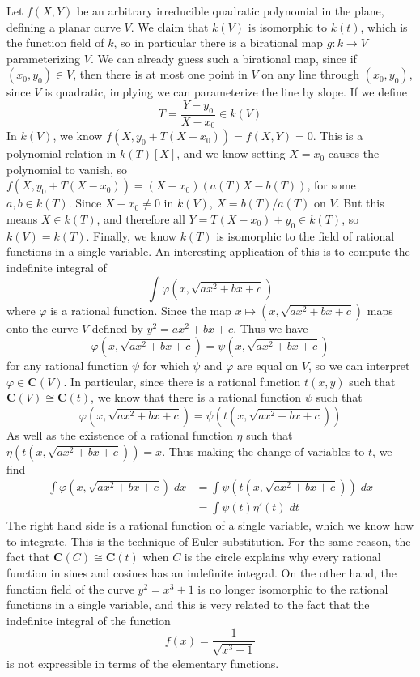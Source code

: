 \begin{example}
    Let $f(X,Y)$ be an arbitrary irreducible quadratic polynomial in the plane, defining a planar curve $V$. We claim that $k(V)$ is isomorphic to $k(t)$, which is the function field of $k$, so in particular there is a birational map $g: k \to V$ parameterizing $V$. We can already guess such a birational map, since if $(x_0,y_0) \in V$, then there is at most one point in $V$ on any line through $(x_0,y_0)$, since $V$ is quadratic, implying we can parameterize the line by slope. If we define
    \[ T = \frac{Y - y_0}{X - x_0} \in k(V) \]
    In $k(V)$, we know $f(X, y_0 + T(X - x_0)) = f(X,Y) = 0$. This is a polynomial relation in $k(T)[X]$, and we know setting $X = x_0$ causes the polynomial to vanish, so $f(X, y_0 + T(X - x_0)) = (X - x_0)(a(T)X - b(T))$, for some $a,b \in k(T)$. Since $X - x_0 \neq 0$ in $k(V)$, $X = b(T)/a(T)$ on $V$. But this means $X \in k(T)$, and therefore all $Y = T(X - x_0) + y_0 \in k(T)$, so $k(V) = k(T)$. Finally, we know $k(T)$ is isomorphic to the field of rational functions in a single variable. An interesting application of this is to compute the indefinite integral of
    \[ \int \varphi \left( x,\sqrt{ax^2 + bx + c} \right) \]
    where $\varphi$ is a rational function. Since the map $x \mapsto (x,\sqrt{ax^2 + bx + c})$ maps onto the curve $V$ defined by $y^2 = ax^2 + bx + c$. Thus we have
    \[ \varphi \left( x, \sqrt{ax^2 + bx + c} \right) = \psi \left( x, \sqrt{ax^2 + bx + c} \right)  \]
    for any rational function $\psi$ for which $\psi$ and $\varphi$ are equal on $V$, so we can interpret $\varphi \in \mathbf{C}(V)$. In particular, since there is a rational function $t(x,y)$ such that $\mathbf{C}(V) \cong \mathbf{C}(t)$, we know that there is a rational function $\psi$ such that
    \[ \varphi \left( x, \sqrt{ax^2 + bx + c} \right) = \psi \left( t \left( x, \sqrt{ax^2 + bx + c} \right) \right) \]
    As well as the existence of a rational function $\eta$ such that $\eta(t(x,\sqrt{ax^2 + bx + c})) = x$. Thus making the change of variables to $t$, we find
    \begin{align*}
        \int \varphi \left( x, \sqrt{ax^2 + bx + c} \right)\; dx &= \int \psi \left(t \left( x, \sqrt{ax^2 + bx + c} \right) \right)\; dx \\
        &= \int \psi(t) \eta'(t) \; dt
    \end{align*}
    The right hand side is a rational function of a single variable, which we know how to integrate. This is the technique of Euler substitution. For the same reason, the fact that $\mathbf{C}(C) \cong \mathbf{C}(t)$ when $C$ is the circle explains why every rational function in sines and cosines has an indefinite integral. On the other hand, the function field of the curve $y^2 = x^3 + 1$ is no longer isomorphic to the rational functions in a single variable, and this is very related to the fact that the indefinite integral of the function
    \[ f(x) = \frac{1}{\sqrt{x^3 + 1}} \]
    is not expressible in terms of the elementary functions.
\end{example}

